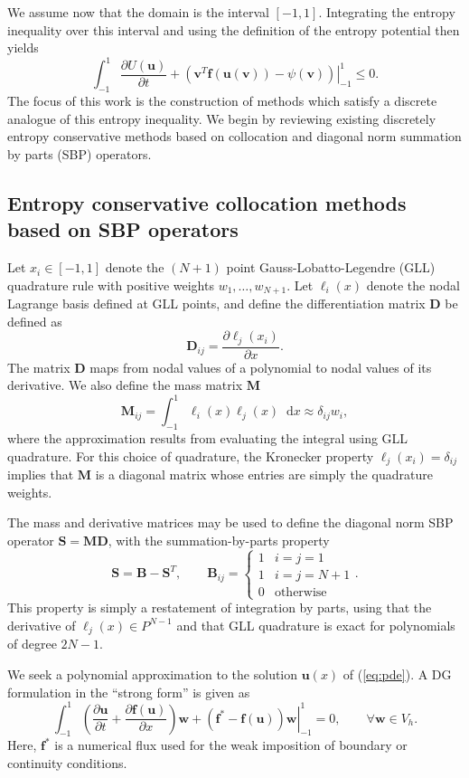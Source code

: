 \documentclass[preprint,10pt]{article}
\theoremstyle{definition}
\theoremstyle{lemma}
\theoremstyle{theorem}
\theoremstyle{assumption}
\newcommand{\pd}[2]{\frac{\partial#1}{\partial#2}}
\newcommand{\LRp}[1]{\left( #1 \right)}
\newcommand*\diff[1]{\mathop{}\!{\mathrm{d}#1}}
\begin{document}
We assume now that the domain is the interval $[-1,1]$.  Integrating the entropy inequality over this interval and using the definition of the entropy potential then yields
\begin{equation}
\int_{-1}^1 \pd{U(\bm{u})}{t} + \left.\LRp{\bm{v}^T\bm{f}(\bm{u}(\bm{v}))-\psi(\bm{v})}\right|_{-1}^1 \leq 0.  
\label{eq:consentropy}
\end{equation}
The focus of this work is the construction of methods which satisfy a discrete analogue of this entropy inequality.  We begin by reviewing existing discretely entropy conservative methods based on collocation and diagonal norm summation by parts (SBP) operators. 

\subsection{Entropy conservative collocation methods based on SBP operators}

Let ${x}_i \in [-1,1]$ denote the $(N+1)$ point Gauss-Lobatto-Legendre (GLL) quadrature rule with positive weights $w_1,\ldots,w_{N+1}$.  Let $\ell_i(x)$ denote the nodal Lagrange basis defined at GLL points, and define the differentiation matrix $\bm{D}$ be defined as 
\[
\bm{D}_{ij} = \pd{\ell_j(x_i)}{x}.
\]
The matrix $\bm{D}$ maps from nodal values of a polynomial to nodal values of its derivative.  We also define the mass matrix $\bm{M}$
\[
\bm{M}_{ij} = \int_{-1}^1 \ell_i(x)\ell_j(x)\diff{x} \approx \delta_{ij} w_i,
\]
where the approximation results from evaluating the integral using GLL quadrature.  For this choice of quadrature, the Kronecker property $\ell_j(x_i) = \delta_{ij}$ implies that $\bm{M}$ is a diagonal matrix whose entries are simply the quadrature weights.  

The mass and derivative matrices may be used to define the diagonal norm SBP operator $\bm{S} = \bm{M}\bm{D}$, with the summation-by-parts property 
\[
\bm{S} = \bm{B} - \bm{S}^T, \qquad \bm{B}_{ij} = \begin{cases}
1 &i = j = 1 \\
1 &i = j = N+1 \\
0 &\text{otherwise}
\end{cases}.
\]
This property is simply a restatement of integration by parts, using that the derivative of $\ell_j(x) \in P^{N-1}$ and that GLL quadrature is exact for polynomials of degree $2N-1$.  

We seek a polynomial approximation to the solution $\bm{u}(x)$ of (\ref{eq:pde}).  A DG formulation in the ``strong form'' \cite{hesthaven2007nodal} is given as
\[
\int_{-1}^1\LRp{ \pd{\bm{u}}{t} + \pd{\bm{f}(\bm{u})}{x}}\bm{w} + \left.\LRp{\bm{f}^* - \bm{f}(\bm{u})} \bm{w}\right|_{-1}^1 = 0, \qquad \forall \bm{w}\in V_h.
\]
Here, $\bm{f}^*$ is a numerical flux used for the weak imposition of boundary or continuity conditions.  
\end{document}
